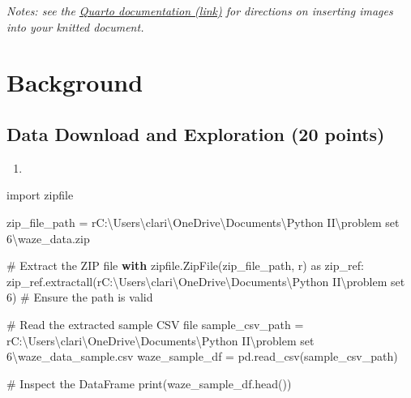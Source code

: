 \documentclass[
  letterpaper,
  DIV=11,
  numbers=noendperiod]{scrartcl}
\newenvironment{Shaded}{\begin{snugshade}}{\end{snugshade}}
\newcommand{\BuiltInTok}[1]{\textcolor[rgb]{0.00,0.23,0.31}{#1}}
\newcommand{\CommentTok}[1]{\textcolor[rgb]{0.37,0.37,0.37}{#1}}
\newcommand{\ControlFlowTok}[1]{\textcolor[rgb]{0.00,0.23,0.31}{\textbf{#1}}}
\newcommand{\ImportTok}[1]{\textcolor[rgb]{0.00,0.46,0.62}{#1}}
\newcommand{\NormalTok}[1]{\textcolor[rgb]{0.00,0.23,0.31}{#1}}
\newcommand{\OperatorTok}[1]{\textcolor[rgb]{0.37,0.37,0.37}{#1}}
\newcommand{\StringTok}[1]{\textcolor[rgb]{0.13,0.47,0.30}{#1}}
\newcommand{\VerbatimStringTok}[1]{\textcolor[rgb]{0.13,0.47,0.30}{#1}}
\providecommand{\tightlist}{%
  \setlength{\itemsep}{0pt}\setlength{\parskip}{0pt}}\usepackage{longtable,booktabs,array}
\begin{document}
\emph{Notes: see the
\href{https://quarto.org/docs/authoring/figures.html}{Quarto
documentation (link)} for directions on inserting images into your
knitted document.}

\section*{Background}\label{background}

\subsection*{Data Download and Exploration (20
points)}\label{data-download-and-exploration-20-points}

\begin{enumerate}
\def\labelenumi{\arabic{enumi}.}
\tightlist
\item
\end{enumerate}

\begin{Shaded}
\begin{Highlighting}[]
\ImportTok{import}\NormalTok{ zipfile}
\end{Highlighting}
\end{Shaded}

\begin{Shaded}
\begin{Highlighting}[]
\NormalTok{zip\_file\_path }\OperatorTok{=} \VerbatimStringTok{r\textquotesingle{}C:\textbackslash{}Users\textbackslash{}clari\textbackslash{}OneDrive\textbackslash{}Documents\textbackslash{}Python II\textbackslash{}problem set 6\textbackslash{}waze\_data.zip\textquotesingle{}}

\CommentTok{\# Extract the ZIP file}
\ControlFlowTok{with}\NormalTok{ zipfile.ZipFile(zip\_file\_path, }\StringTok{\textquotesingle{}r\textquotesingle{}}\NormalTok{) }\ImportTok{as}\NormalTok{ zip\_ref:}
\NormalTok{    zip\_ref.extractall(}\VerbatimStringTok{r\textquotesingle{}C:\textbackslash{}Users\textbackslash{}clari\textbackslash{}OneDrive\textbackslash{}Documents\textbackslash{}Python II\textbackslash{}problem set 6\textquotesingle{}}\NormalTok{)  }\CommentTok{\# Ensure the path is valid}

\CommentTok{\# Read the extracted sample CSV file}
\NormalTok{sample\_csv\_path }\OperatorTok{=} \VerbatimStringTok{r\textquotesingle{}C:\textbackslash{}Users\textbackslash{}clari\textbackslash{}OneDrive\textbackslash{}Documents\textbackslash{}Python II\textbackslash{}problem set 6\textbackslash{}waze\_data\_sample.csv\textquotesingle{}}
\NormalTok{waze\_sample\_df }\OperatorTok{=}\NormalTok{ pd.read\_csv(sample\_csv\_path)}

\CommentTok{\# Inspect the DataFrame}
\BuiltInTok{print}\NormalTok{(waze\_sample\_df.head())}
\end{Highlighting}
\end{Shaded}
\end{document}
